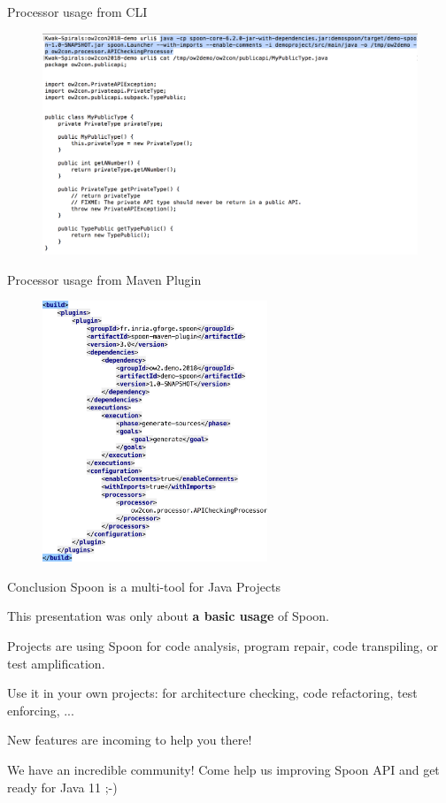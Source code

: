 \documentclass{beamer}
\begin{document}
\begin{frame}{Processor usage from CLI}
\begin{figure}
\centering
\includegraphics[width=\textwidth]{figures/processor/cli.png}
\end{figure}
\end{frame}

\begin{frame}{Processor usage from Maven Plugin}
\begin{figure}
\centering
\includegraphics[width=0.6\textwidth]{figures/processor/maven-config.pdf}
\end{figure}
\end{frame}

\begin{frame}{Conclusion}
Spoon is a multi-tool for Java Projects

This presentation was only about \textbf{a basic usage} of Spoon.

Projects are using Spoon for code analysis, program repair, code transpiling, or test amplification. 

Use it in your own projects: for architecture checking, code refactoring, test enforcing, ... 

New features are incoming to help you there!

We have an incredible community! 
Come help us improving Spoon API and get ready for Java 11 ;-)
\end{frame}
\end{document}
